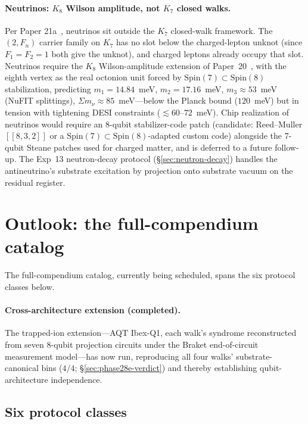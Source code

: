 \documentclass[11pt]{article}
\begin{document}
\paragraph{Neutrinos: $K_8$ Wilson amplitude, not $K_7$ closed walks.}
Per Paper 21a~\cite[\S 3.6]{Paper21a}, neutrinos sit outside the $K_7$ closed-walk framework.  The $(2, F_n)$ carrier family on $K_7$ has no slot below the charged-lepton unknot (since $F_1 = F_2 = 1$ both give the unknot), and charged leptons already occupy that slot.  Neutrinos require the $K_8$ Wilson-amplitude extension of Paper~20~\cite{Paper20}, with the eighth vertex as the real octonion unit forced by $\mathrm{Spin}(7) \subset \mathrm{Spin}(8)$ stabilization, predicting $m_1 = 14.84$~meV, $m_2 = 17.16$~meV, $m_3 \approx 53$~meV (NuFIT splittings), $\Sigma m_\nu \approx 85$~meV---below the Planck bound ($120$~meV) but in tension with tightening DESI constraints ($\lesssim 60$--$72$~meV).  Chip realization of neutrinos would require an 8-qubit stabilizer-code patch (candidate: Reed--Muller $[\![8, 3, 2]\!]$ or a $\mathrm{Spin}(7) \subset \mathrm{Spin}(8)$-adapted custom code) alongside the 7-qubit Steane patches used for charged matter, and is deferred to a future follow-up.  The Exp~13 neutron-decay protocol (\S\ref{sec:neutron-decay}) handles the antineutrino's substrate excitation by projection onto substrate vacuum on the residual register.

\section{Outlook: the full-compendium catalog}
\label{sec:outlook}

The full-compendium catalog, currently being scheduled, spans the six protocol classes below.

\paragraph{Cross-architecture extension (completed).}  The trapped-ion extension---AQT Ibex-Q1, each walk's syndrome reconstructed from seven $8$-qubit projection circuits under the Braket end-of-circuit measurement model---has now run, reproducing all four walks' substrate-canonical bins ($4/4$; \S\ref{sec:phase28e-verdict}) and thereby establishing qubit-architecture independence.

\subsection{Six protocol classes}
\label{sec:phase3-classes}
\end{document}
